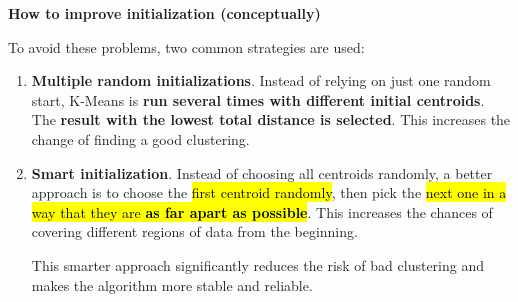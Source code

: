 \highspace
\begin{flushleft}
    \textcolor{Green3}{ \textbf{How to improve initialization (conceptually)}}
\end{flushleft}
To avoid these problems, two common strategies are used:
\begin{enumerate}
    \item \textcolor{Green3}{\textbf{Multiple random initializations}}. Instead of relying on just one random start, K-Means is \textbf{run several times with different initial centroids}. The \textbf{result with the lowest total distance is selected}. This increases the change of finding a good clustering.
    
    \item \textcolor{Green3}{\textbf{Smart initialization}}. Instead of choosing all centroids randomly, a better approach is to choose the \hl{first centroid randomly}, then pick the \hl{next one in a way that they are \textbf{as far apart as possible}}. This increases the chances of covering different regions of data from the beginning.
    
    This smarter approach significantly reduces the risk of bad clustering and makes the algorithm more stable and reliable.
\end{enumerate}